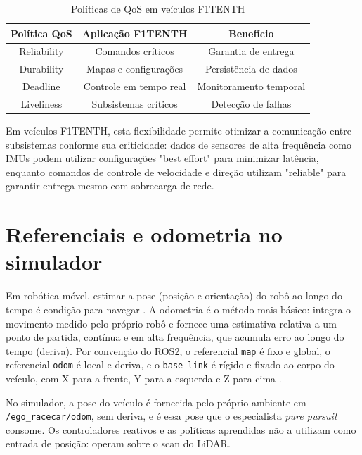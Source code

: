 \begin{table}[h]
    \centering
    \begin{tabular}{|c|c|c|}
        \hline
        \textbf{Política QoS} & \textbf{Aplicação F1TENTH} & \textbf{Benefício}     \\
        \hline
        Reliability           & Comandos críticos          & Garantia de entrega    \\
        \hline
        Durability            & Mapas e configurações      & Persistência de dados  \\
        \hline
        Deadline              & Controle em tempo real     & Monitoramento temporal \\
        \hline
        Liveliness            & Subsistemas críticos       & Detecção de falhas     \\
        \hline
    \end{tabular}
    \caption{Políticas de QoS em veículos F1TENTH}
    \label{tab:qos_policies}
\end{table}

Em veículos F1TENTH, esta flexibilidade permite otimizar a comunicação entre
subsistemas conforme sua criticidade: dados de sensores de alta frequência como
IMUs podem utilizar configurações "best effort" para minimizar latência,
enquanto comandos de controle de velocidade e direção utilizam "reliable" para
garantir entrega mesmo com sobrecarga de rede.


\section{Referenciais e odometria no simulador}

Em robótica móvel, estimar a pose (posição e orientação) do robô ao longo do
tempo é condição para navegar \cite{thrun2005}. A odometria é o método mais
básico: integra o movimento medido pelo próprio robô e fornece uma estimativa
relativa a um ponto de partida, contínua e em alta frequência, que acumula erro
ao longo do tempo (deriva). Por convenção do ROS2, o referencial \texttt{map} é
fixo e global, o referencial \texttt{odom} é local e deriva, e o
\texttt{base\_link} é rígido e fixado ao corpo do veículo, com X para a frente,
Y para a esquerda e Z para cima \cite{Babu2020Simulator}.

No simulador, a pose do veículo é fornecida pelo próprio ambiente em
\texttt{/ego\_racecar/odom}, sem deriva, e é essa pose que o especialista
\textit{pure pursuit} consome. Os controladores reativos e as políticas
aprendidas não a utilizam como entrada de posição: operam sobre o scan do LiDAR.

